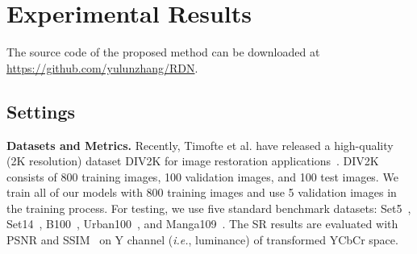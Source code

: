 \documentclass[10pt,twocolumn,letterpaper]{article}
\begin{document}
\iffalse
\textbf{Difference to EDSR.} Being very wide, EDSR~\cite{lim2017enhanced} has achieved top ranks in both the standard benchmark datasets and the DIV2K~\cite{timofte2017ntire} dataset. As we would also use the DIV2K dataset for training, here we also discuss three main differences between EDSR and RDN. The first is the design of the basic building module in network. EDSR utilizes residual block to build the network by removing unnecessary modules, resulting in a chain structure and create short paths from early layers to later layers. While, we propose RDB as the basic building block and extract local dense features. The local dense features not only flow into each layer of the next RDB, but also prepare for efficient global feature fusion. Second, we propose global feature fusion to utilize all local dense features, obtaining global dense features. While, EDSR doesn't use the hierarchical features in a global way. Third, EDSR uses very wide network (e.g., 256 feature channels per Conv layer), which causes the training procedure to be numerically unstable. To resolve this issue, residual scaling~\cite{szegedy2017inception} is adopted into EDSR. While, we use far less number of feature channels per Conv layer in the LR space (e.g., 64). As a result, RDN don't have to adopt residual scaling to stabilize the training procedure.   
\fi


\section{Experimental Results}
\label{sec:results}
\vspace{-2mm}
The source code of the proposed method can be downloaded at \href{https://github.com/yulunzhang/RDN}{https://github.com/yulunzhang/RDN}.

\subsection{Settings}
\label{subsec:settings}
\vspace{-2mm}
\textbf{Datasets and Metrics.}
Recently, Timofte et al. have released a high-quality (2K resolution) dataset DIV2K for image restoration applications~\cite{timofte2017ntire}. DIV2K consists of 800 training images, 100 validation images, and 100 test images. We train all of our models with 800 training images and use 5 validation images in the training process. For testing, we use five standard benchmark datasets: Set5~\cite{bevilacqua2012low}, Set14~\cite{zeyde2012single}, B100~\cite{martin2001database}, Urban100~\cite{huang2015single}, and Manga109~\cite{matsui2017sketch}. The SR results are evaluated with PSNR and SSIM~\cite{wang2004image} on Y channel (\textit{i.e.}, luminance) of transformed YCbCr space.
\end{document}
